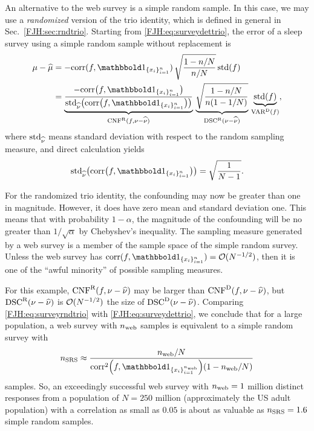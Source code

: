 \documentclass[graybox,footinfo]{svmult}
\DeclareMathOperator{\algn}{CNF}
\DeclareMathOperator{\disc}{DSC}
\DeclareMathOperator{\Var}{VAR}
\begin{document}
An alternative to the web survey is a simple random sample.  In this 
case, we may use a 
\emph{randomized} version of the trio identity, which is defined in general in Sec.\  
\ref{FJH:sec:rndtrio}.  Starting 
from \eqref{FJH:eq:surveydettrio}, the 
error of a sleep survey using a simple random sample without replacement is
\begin{align}
\nonumber
\mu - \widehat{\mu} 
& = -\corr(f, \bbone_{\{x_i\}_{i=1}^n}) \,
\sqrt{\frac{1 - n/N}{n/N}} \, 
\std(f) \\
& = \underbrace{\frac{- \corr\bigl(f, \bbone_{\{x_i\}_{i=1}^n}\bigr)}
{\std_{\hnu} \bigl( \corr\bigl(f, \bbone_{\{x_i\}_{i=1}^n}\bigr)\bigr)}}_{\algn^\Rn(f,\nu - \hnu)} 
\, 
\underbrace{\sqrt{\frac{1-n/N}{n(1-1/N)}}}_{\disc^\Rn(\nu - \hnu)} \, 
\underbrace{\std(f)}_{\Var^\Dt(f)},
\label{FJH:eq:surveyrndtrio}
\end{align}
where $\textup{std}_{\widehat{\nu}}$ means standard deviation with respect to the random sampling 
measure, and direct calculation yields
\begin{equation*}
\std_{\hnu} \bigl( \corr\bigl(f, \bbone_{\{x_i\}_{i=1}^n}\bigr)\bigr) = \sqrt{\frac{1}{N-1}}.
\end{equation*}

For the randomized trio identity, the confounding may now be greater than one in 
magnitude.  However, it  does have zero mean and 
standard deviation one.  This means that with probability $1-\alpha$, the magnitude of 
the confounding will be no greater than $1/\sqrt{\alpha}$ by Chebyshev's inequality. The 
sampling measure generated by a web survey is a member of the sample space of the 
simple random survey.  Unless the 
web survey has $\corr(f, \bbone_{\{x_i\}_{i=1}^n}) = \Order(N^{-1/2})$, then it is one of 
the ``awful minority'' of possible sampling measures.

For this example, $\algn^\Rn(f,\nu - \hnu)$ may be larger than $\algn^\Dt(f,\nu - \hnu)$, 
but  $\disc^\Rn(\nu - \hnu)$ is $\mathcal{O}(N^{-1/2})$ the size of $\disc^\Dt(\nu - 
\hnu)$.  Comparing \eqref{FJH:eq:surveyrndtrio} with 
\eqref{FJH:eq:surveydettrio}, we conclude that for a large population, a web survey with 
$n_{\textup{web}}$ samples is equivalent to a simple random survey with 
\[
n_{\textup{SRS}} \approx \frac{n_{\textup{web}}/N}{\corr^2\Bigl(f, 
\bbone_{\{x_i\}_{i=1}^{n_{\textup{web}}}}\Bigr)(1-n_{\textup{web}}/N)}
\]
samples.  So, an exceedingly successful web survey with $n_{\textup{web}} = 
1$ million distinct responses from a population of $N = 250$ million 
(approximately the US adult population) with a correlation as small as $0.05$ is about as 
valuable as $n_{\textup{SRS}} = 1.6$ simple random samples.
\end{document}
